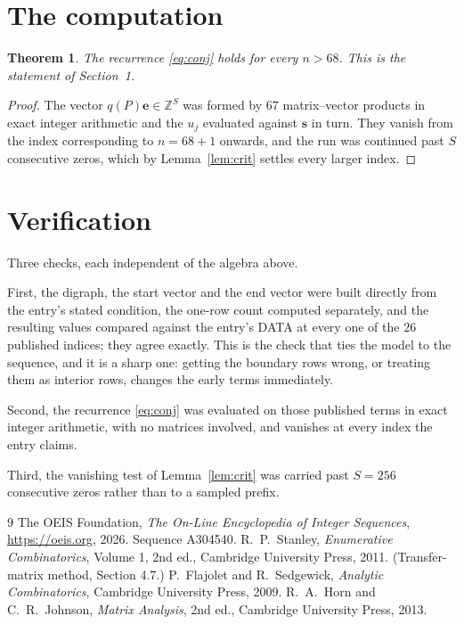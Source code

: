 \documentclass[11pt,a4paper]{article}
\theoremstyle{plain}
\newtheorem{theorem}{Theorem}
\theoremstyle{definition}
\begin{document}
\section{The computation}

\begin{theorem}
The recurrence \eqref{eq:conj} holds for every $n>68$. This is the statement of
Section~1.
\end{theorem}

\begin{proof}
The vector $q(P)\mathbf{e}\in\mathbb{Z}^{S}$ was formed by $67$ matrix--vector
products in exact integer arithmetic and the $u_j$ evaluated against $\mathbf{s}$ in turn.
They vanish from the index corresponding to $n=68+1$ onwards, and the run was continued
past $S$ consecutive zeros, which by Lemma~\ref{lem:crit} settles every larger index.
\end{proof}

\section{Verification}

Three checks, each independent of the algebra above.

First, the digraph, the start vector and the end vector were built directly from the
entry's stated condition, the one-row count computed separately, and the resulting values
compared against the entry's DATA at every one of the $26$ published indices; they
agree exactly. This is the check that ties the model to the sequence, and it is a sharp one:
getting the boundary rows wrong, or treating them as interior rows, changes the early terms
immediately.

Second, the recurrence \eqref{eq:conj} was evaluated on those published terms in exact
integer arithmetic, with no matrices involved, and vanishes at every index the entry claims.

Third, the vanishing test of Lemma~\ref{lem:crit} was carried past $S=256$ consecutive
zeros rather than to a sampled prefix.

\begin{thebibliography}{9}
 The OEIS Foundation, \emph{The On-Line Encyclopedia of Integer
Sequences}, \url{https://oeis.org}, 2026. Sequence A304540.
 R.~P.~Stanley, \emph{Enumerative Combinatorics}, Volume 1, 2nd ed.,
Cambridge University Press, 2011. (Transfer-matrix method, Section 4.7.)
 P.~Flajolet and R.~Sedgewick, \emph{Analytic Combinatorics}, Cambridge
University Press, 2009.
 R.~A.~Horn and C.~R.~Johnson, \emph{Matrix Analysis}, 2nd ed., Cambridge
University Press, 2013.
\end{thebibliography}
\end{document}
